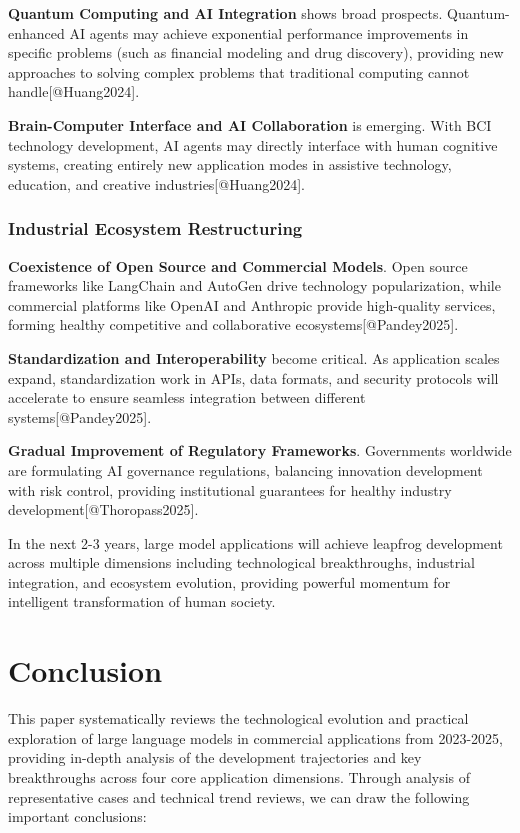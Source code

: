 \documentclass{article}
\begin{document}
\textbf{Quantum Computing and AI Integration} shows broad prospects. Quantum-enhanced AI agents may achieve exponential performance improvements in specific problems (such as financial modeling and drug discovery), providing new approaches to solving complex problems that traditional computing cannot handle[@Huang2024].

\textbf{Brain-Computer Interface and AI Collaboration} is emerging. With BCI technology development, AI agents may directly interface with human cognitive systems, creating entirely new application modes in assistive technology, education, and creative industries[@Huang2024].

\subsubsection{Industrial Ecosystem Restructuring}
\textbf{Coexistence of Open Source and Commercial Models}. Open source frameworks like LangChain and AutoGen drive technology popularization, while commercial platforms like OpenAI and Anthropic provide high-quality services, forming healthy competitive and collaborative ecosystems[@Pandey2025].

\textbf{Standardization and Interoperability} become critical. As application scales expand, standardization work in APIs, data formats, and security protocols will accelerate to ensure seamless integration between different systems[@Pandey2025].

\textbf{Gradual Improvement of Regulatory Frameworks}. Governments worldwide are formulating AI governance regulations, balancing innovation development with risk control, providing institutional guarantees for healthy industry development[@Thoropass2025].

In the next 2-3 years, large model applications will achieve leapfrog development across multiple dimensions including technological breakthroughs, industrial integration, and ecosystem evolution, providing powerful momentum for intelligent transformation of human society.

\section{Conclusion}
This paper systematically reviews the technological evolution and practical exploration of large language models in commercial applications from 2023-2025, providing in-depth analysis of the development trajectories and key breakthroughs across four core application dimensions. Through analysis of representative cases and technical trend reviews, we can draw the following important conclusions:
\end{document}
